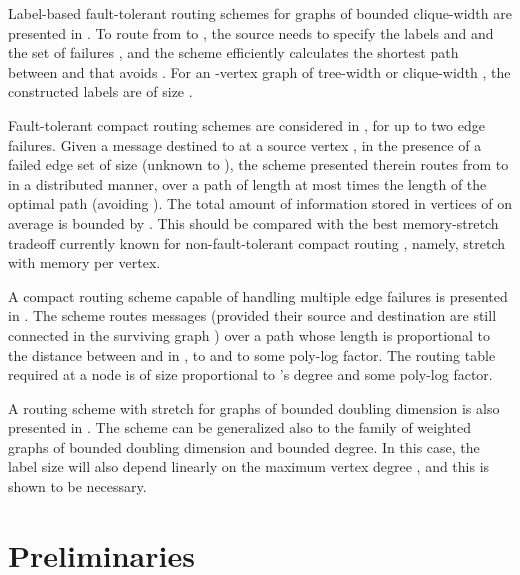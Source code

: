 \documentclass[12pt]{article}
\begin{document}
Label-based fault-tolerant routing schemes for graphs of
bounded clique-width are presented in \cite{CT07}.
To route from  to , the source needs to specify the labels
 and  and the set of failures , and the scheme
efficiently calculates the shortest path between  and  that avoids .
For an -vertex graph of tree-width or clique-width , the
constructed labels are of size .
\par
Fault-tolerant compact routing schemes are considered
in \cite{CLPR09-do}, for up to two edge failures.
Given a message  destined to  at a source vertex , in the
presence of a failed edge set  of size  (unknown to ),
the scheme presented therein routes  from  to 
in a distributed manner, over a path of length at most  times
the length of the optimal path (avoiding ).
The total amount of information stored in vertices of 
on average is bounded by .
This should be compared with the best memory-stretch tradeoff currently
known for non-fault-tolerant compact routing \cite{TZ01}, namely,
 stretch with  memory per vertex.
\par
A compact routing scheme capable of handling multiple edge failures
is presented in \cite{S12}.
The scheme routes messages (provided their source  and destination 
are still connected in the surviving graph )
over a path whose length is proportional to the distance between  and 
in , to  and to some poly-log factor.
The routing table required at a node  is of size proportional to
's degree and some poly-log factor.
\par
A routing scheme with stretch  for graphs of bounded
doubling dimension is also presented in \cite{ACGP10}.
The scheme can be generalized also to the family of weighted graphs
of bounded doubling dimension and bounded degree.
In this case, the label size will also depend linearly on the maximum
vertex degree , and this is shown to be necessary.

\section{Preliminaries}
\label{sec:prelim}
\end{document}
